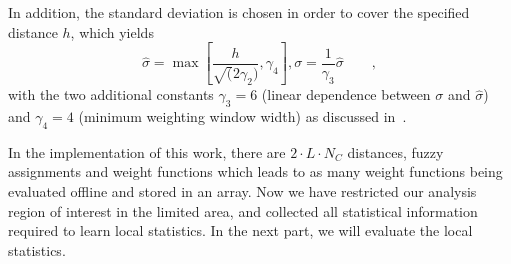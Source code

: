 \documentclass[conference]{IEEEtran}
\begin{document}

In addition, the standard
deviation is chosen in order to cover the specified distance $h$,
which yields 
\begin{equation}
  \label{eq:deviation}
  \hat{\sigma} = \max \left[\frac{h}{\sqrt(2\gamma_2)}, \gamma_4
  \right], \sigma  = \frac{1}{\gamma_3} \hat{\sigma}\qquad,
\end{equation}
with the two additional constants $\gamma_3 = 6$ (linear dependence
between $\sigma$ and $\hat{\sigma}$) and $\gamma_4 = 4$ (minimum
weighting window width) as discussed in~\cite{panin2006efficient}. 

In the implementation of this work,
there are $2 \cdot L \cdot N_C$ distances, fuzzy assignments
and weight functions which leads to as many weight functions being evaluated offline and stored in an array. Now we have restricted our analysis region of interest in the
limited area, and collected all statistical information required to learn
local statistics. In the next part, we will evaluate the local
statistics.
\end{document}
